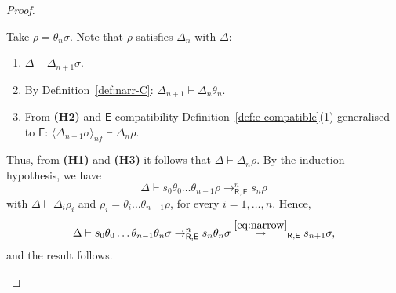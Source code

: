\documentclass[submission,copyright,creativecommons]{eptcs}
\newcommand{\theory}[1]{\ensuremath{\mathsf{#1}}}
\theoremstyle{plain}
\theoremstyle{definition}
\theoremstyle{remark}
\begin{document}
\begin{proof}
\begin{itemize}
    
    
    Take $\rho = \theta_n\sigma$. Note that  $\rho$ satisfies $\Delta_n$ with $\Delta$:
    \begin{enumerate}[\bf (H1)]
        \item $\Delta\vdash \Delta_{n+1}\sigma$.
        \item By Definition~\ref{def:narr-C}: $\Delta_{n+1}\vdash \Delta_n\theta_n$.
        \item From {\bf (H2)} and \theory{E}-compatibility Definition~\ref{def:e-compatible}(1) generalised to \theory{E}:  $\langle\Delta_{n+1}\sigma\rangle_{nf} \vdash \Delta_n\rho$.
    \end{enumerate}
     Thus, from {\bf (H1)} and {\bf (H3)} it follows that  $\Delta\vdash \Delta_n\rho$.
    By the induction hypothesis,  we have 
    $$\Delta \vdash s_0\theta_0\ldots\theta_{n-1}\rho \rightarrow^{n}_{\theory{R,E}} s_n\rho$$
    with $\Delta\vdash \Delta_i\rho_i$ 
    and $\rho_i = \theta_i\ldots\theta_{n-1}\rho$, for every $i=1,\ldots, n$. Hence,
    $$\Delta \vdash s_0\theta_0\ldots\theta_{n-1}\theta_n\sigma \to^{n}_{\theory{R,E}} s_n\theta_n\sigma \overset{\eqref{eq:narrow}}{\to}_{\theory{R,E}} s_{n+1}\sigma,$$
    and the result follows.
%
\end{itemize}
%
\end{proof}



\end{document}
